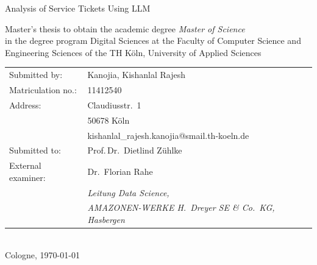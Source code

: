 \begin{titlepage}
%
\sffamily%
%
\begin{center}
\end{center}
%
\vfill
%
{\huge Analysis of Service Tickets Using LLM \par}
%
Master's thesis to obtain the academic degree\newline
\emph{Master of Science}\\
in the degree program Digital Sciences\newline
at the Faculty of Computer Science and Engineering Sciences\newline
of the TH Köln, University of Applied Sciences
%
\vfill
%
\begin{tabular}{@{}ll}
Submitted by:    & Kanojia, Kishanlal Rajesh\\
Matriculation no.: & 11412540\\
Address:         & Claudiusstr.\ 1\\
                 & 50678 Köln\\
                 & kishanlal\_rajesh.kanojia@smail.th-koeln.de\\[5mm]
Submitted to:    & Prof.\,Dr.\ Dietlind Zühlke \\
External examiner: & Dr.\ Florian Rahe \\
                 & \small\textit{Leitung Data Science,}\\
                 & \small\textit{AMAZONEN-WERKE H.\ Dreyer SE \& Co.\ KG, Hasbergen}
\end{tabular}
%
\\[10mm]
%
Cologne, \today%
%
\end{titlepage}